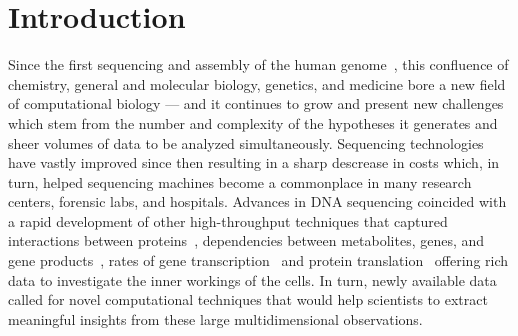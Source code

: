 \chapter{Introduction}



Since the first sequencing and assembly of the human genome~\cite{FirstHumanGenome}, this confluence of chemistry, general and molecular biology, genetics, and medicine bore a new field of computational biology --- and it continues to grow and present new challenges which stem from the number and complexity of the hypotheses it generates and sheer volumes of data to be analyzed simultaneously. Sequencing technologies have vastly improved since then resulting in a sharp descrease in costs which, in turn, helped sequencing machines become a commonplace in many research centers, forensic labs, and hospitals. Advances in DNA sequencing coincided with a rapid development of other high-throughput techniques that captured interactions between proteins~\cite{Ito2001,TAPMS}, dependencies between metabolites, genes, and gene products~\cite{ChipSeq,GeneKnockouts}, rates of gene transcription~\cite{RNAseq} and protein translation~\cite{riboseq} offering rich data to investigate the inner workings of the cells. In turn, newly available data called for novel computational techniques that would help scientists to extract meaningful insights from these large multidimensional observations.


